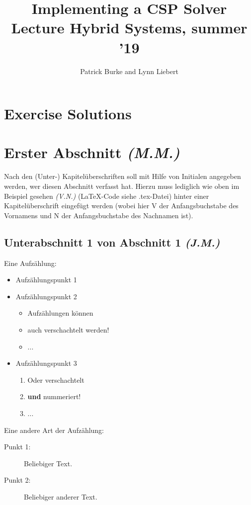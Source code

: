 \documentclass{article}
\title{Implementing a CSP Solver\\\small{Lecture Hybrid Systems, summer '19}}
\author{Patrick Burke and Lynn Liebert}
\newcommand{\initials}[1]{\small{\textit{(#1)}} \normalsize}
\begin{document}
\maketitle %

\listoftodos

\begin{abstract}
\end{abstract}

\tableofcontents
\newpage


\newpage


\section{Exercise Solutions}







\section{Erster Abschnitt \initials{M.M.}}
Nach den (Unter-) Kapitelüberschriften soll mit Hilfe von Initialen angegeben werden, wer diesen Abschnitt verfasst hat. Hierzu muss lediglich wie oben im Beispiel gesehen \initials{V.N.} (LaTeX-Code siehe .tex-Datei) hinter einer Kapitelüberschrift eingefügt werden (wobei hier V der Anfangsbuchstabe des Vornamens und N der Anfangsbuchstabe des Nachnamen ist). 
\subsection{Unterabschnitt 1 von Abschnitt 1 \initials{J.M.}}
Eine Aufzählung:
\begin{itemize}
    \item Aufzählungspunkt 1
    \item Aufzählungspunkt 2
	\begin{itemize}
	    \item Aufzählungen können 
	    \item auch verschachtelt werden!
	    \item ...
	\end{itemize}    
    \item Aufzählungspunkt 3
	\begin{enumerate}
	    \item Oder verschachtelt
	    \item \textbf{und} nummeriert!
	    \item ...
	\end{enumerate}
\end{itemize}
Eine andere Art der Aufzählung:
\begin{description}
    \item[Punkt 1: ] Beliebiger Text.
    \item[Punkt 2: ] Beliebiger anderer Text.
\end{description}
\end{document}

